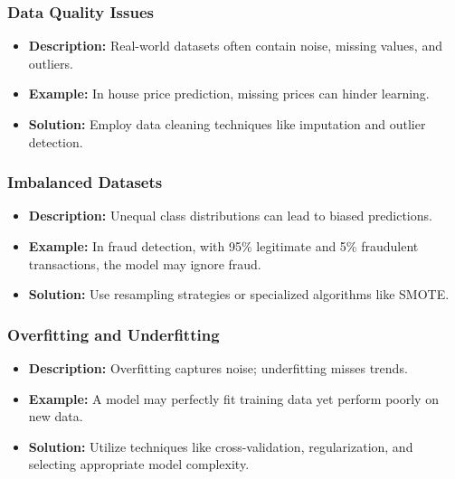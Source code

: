 \documentclass[aspectratio=169]{beamer}
\begin{document}
\begin{frame}[fragile]
    \frametitle{Data Quality Issues}
    \begin{itemize}
        \item \textbf{Description:} Real-world datasets often contain noise, missing values, and outliers.
        \item \textbf{Example:} In house price prediction, missing prices can hinder learning.
        \item \textbf{Solution:} Employ data cleaning techniques like imputation and outlier detection.
    \end{itemize}
\end{frame}

\begin{frame}[fragile]
    \frametitle{Imbalanced Datasets}
    \begin{itemize}
        \item \textbf{Description:} Unequal class distributions can lead to biased predictions.
        \item \textbf{Example:} In fraud detection, with 95\% legitimate and 5\% fraudulent transactions, the model may ignore fraud.
        \item \textbf{Solution:} Use resampling strategies or specialized algorithms like SMOTE.
    \end{itemize}
\end{frame}

\begin{frame}[fragile]
    \frametitle{Overfitting and Underfitting}
    \begin{itemize}
        \item \textbf{Description:} Overfitting captures noise; underfitting misses trends.
        \item \textbf{Example:} A model may perfectly fit training data yet perform poorly on new data.
        \item \textbf{Solution:} Utilize techniques like cross-validation, regularization, and selecting appropriate model complexity.
    \end{itemize}
\end{frame}
\end{document}
